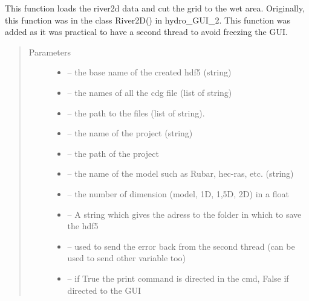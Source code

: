 \documentclass[letterpaper,10pt,english]{sphinxmanual}
\begin{document}
\begin{fulllineitems}
\label{\detokenize{index:src.river2d.load_river2d_and_cut_grid}}
This function loads the river2d data and cut the grid to the wet area. Originally, this function was in the class
River2D() in hydro\_GUI\_2. This function was added as it was practical to have a second thread to avoid freezing
the GUI.
\begin{quote}\begin{description}
\item[{Parameters}] \leavevmode\begin{itemize}
\item {} 
 -- the base name of the created hdf5 (string)

\item {} 
 -- the names of all the cdg file (list of string)

\item {} 
 -- the path to the files (list of string).

\item {} 
 -- the name of the project (string)

\item {} 
 -- the path of the project

\item {} 
 -- the name of the model such as Rubar, hec-ras, etc. (string)

\item {} 
 -- the number of dimension (model, 1D, 1,5D, 2D) in a float

\item {} 
 -- A string which gives the adress to the folder in which to save the hdf5

\item {} 
 -- used to send the error back from the second thread (can be used to send other variable too)

\item {} 
 -- if True the print command is directed in the cmd, False if directed to the GUI

\end{itemize}

\end{description}\end{quote}

\end{fulllineitems}
\end{document}
